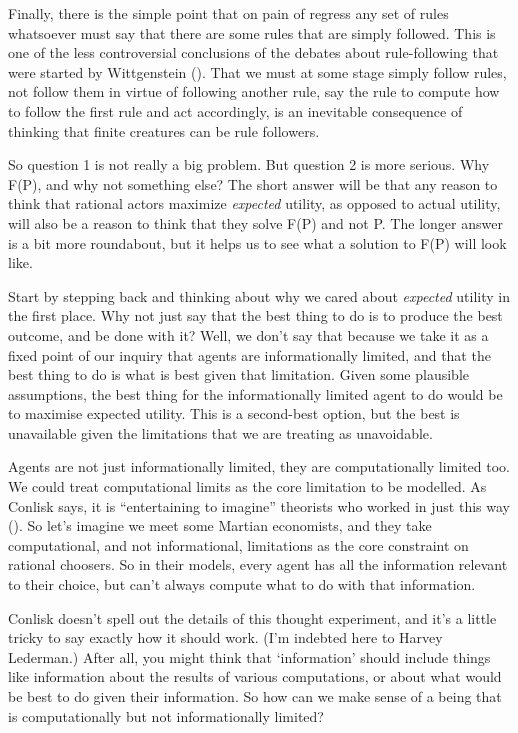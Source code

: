 \documentclass[
  10pt,
  letterpaper,
  twoside]{scrbook}
\begin{document}
Finally, there is the simple point that on pain of regress any set of
rules whatsoever must say that there are some rules that are simply
followed. This is one of the less controversial conclusions of the
debates about rule-following that were started by Wittgenstein
(). That we must at some stage
simply follow rules, not follow them in virtue of following another
rule, say the rule to compute how to follow the first rule and act
accordingly, is an inevitable consequence of thinking that finite
creatures can be rule followers.

So question 1 is not really a big problem. But question 2 is more
serious. Why F(P), and why not something else? The short answer will be
that any reason to think that rational actors maximize \emph{expected}
utility, as opposed to actual utility, will also be a reason to think
that they solve F(P) and not P. The longer answer is a bit more
roundabout, but it helps us to see what a solution to F(P) will look
like.

Start by stepping back and thinking about why we cared about
\emph{expected} utility in the first place. Why not just say that the
best thing to do is to produce the best outcome, and be done with it?
Well, we don't say that because we take it as a fixed point of our
inquiry that agents are informationally limited, and that the best thing
to do is what is best given that limitation. Given some plausible
assumptions, the best thing for the informationally limited agent to do
would be to maximise expected utility. This is a second-best option, but
the best is unavailable given the limitations that we are treating as
unavoidable.

Agents are not just informationally limited, they are computationally
limited too. We could treat computational limits as the core limitation
to be modelled. As Conlisk says, it is ``entertaining to imagine''
theorists who worked in just this way
(). So let's imagine we
meet some Martian economists, and they take computational, and not
informational, limitations as the core constraint on rational choosers.
So in their models, every agent has all the information relevant to
their choice, but can't always compute what to do with that information.

Conlisk doesn't spell out the details of this thought experiment, and
it's a little tricky to say exactly how it should work. (I'm indebted
here to Harvey Lederman.) After all, you might think that `information'
should include things like information about the results of various
computations, or about what would be best to do given their information.
So how can we make sense of a being that is computationally but not
informationally limited?
\end{document}
